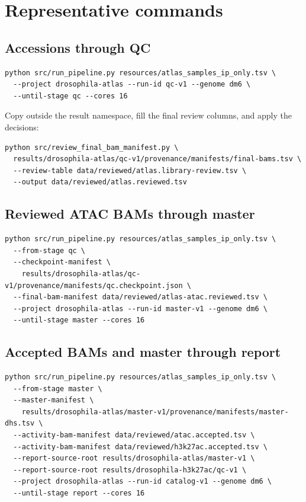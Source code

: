 \documentclass[11pt]{article}
\newcommand{\filep}[1]{\path{#1}}
\begin{document}
\section{Representative commands}

\subsection{Accessions through QC}

\begin{lstlisting}
python src/run_pipeline.py resources/atlas_samples_ip_only.tsv \
  --project drosophila-atlas --run-id qc-v1 --genome dm6 \
  --until-stage qc --cores 16
\end{lstlisting}

Copy \filep{qc/library-review.tsv} outside the result namespace, fill the final
review columns, and apply the decisions:

\begin{lstlisting}
python src/review_final_bam_manifest.py \
  results/drosophila-atlas/qc-v1/provenance/manifests/final-bams.tsv \
  --review-table data/reviewed/atlas.library-review.tsv \
  --output data/reviewed/atlas.reviewed.tsv
\end{lstlisting}

\subsection{Reviewed ATAC BAMs through master}

\begin{lstlisting}
python src/run_pipeline.py resources/atlas_samples_ip_only.tsv \
  --from-stage qc \
  --checkpoint-manifest \
    results/drosophila-atlas/qc-v1/provenance/manifests/qc.checkpoint.json \
  --final-bam-manifest data/reviewed/atlas-atac.reviewed.tsv \
  --project drosophila-atlas --run-id master-v1 --genome dm6 \
  --until-stage master --cores 16
\end{lstlisting}

\subsection{Accepted BAMs and master through report}

\begin{lstlisting}
python src/run_pipeline.py resources/atlas_samples_ip_only.tsv \
  --from-stage master \
  --master-manifest \
    results/drosophila-atlas/master-v1/provenance/manifests/master-dhs.tsv \
  --activity-bam-manifest data/reviewed/atac.accepted.tsv \
  --activity-bam-manifest data/reviewed/h3k27ac.accepted.tsv \
  --report-source-root results/drosophila-atlas/master-v1 \
  --report-source-root results/drosophila-h3k27ac/qc-v1 \
  --project drosophila-atlas --run-id catalog-v1 --genome dm6 \
  --until-stage report --cores 16
\end{lstlisting}
\end{document}
